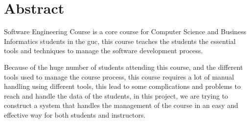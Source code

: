 \chapter*{Abstract}
\label{chap:abstract}

Software Engineering Course is a core course for Computer Science and Business Informatics students in the \ac{guc},
this course teaches the students the essential tools and techniques to manage the software development process.

\newParagraph
Because of the huge number of students attending this course, and the different tools used to manage the course process, this course requires a lot of manual
handling using different tools, this lead to some complications and problems to reach and handle the data of the students, in this project, we are trying to construct a system that handles the management of the course in an easy and effective
way for both students and instructors.
